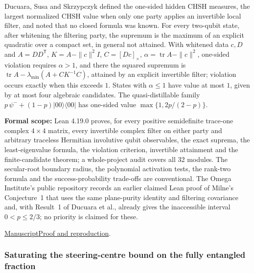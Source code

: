 \documentclass[11pt,a4paper]{article}
\begin{document}
Ducuara, Susa and Skrzypczyk defined the one-sided hidden CHSH measures, the largest normalized CHSH value when only one party applies an invertible local filter, and noted that no closed formula was known. For every two-qubit state, after whitening the filtering party, the supremum is the maximum of an explicit quadratic over a compact set, in general not attained. With whitened data $c,D$ and $A=DD^{\mathsf T}$, $K=A-\|c\|^2I$, $C=[Dc]_\times$, $\alpha=\operatorname{tr}A-\|c\|^2$, one-sided violation requires $\alpha>1$, and there the squared supremum is $\operatorname{tr}A-\lambda_{\min}(A+CK^{-1}C)$, attained by an explicit invertible filter; violation occurs exactly when this exceeds $1$. States with $\alpha\le1$ have value at most $1$, given by at most four algebraic candidates. The quasi-distillable family $p\,\psi^-+(1-p)|00\rangle\langle00|$ has one-sided value $\max\{1,2p/(2-p)\}$.

\noindent\textbf{Formal scope:} Lean 4.19.0 proves, for every positive semidefinite trace-one complex $4\times4$ matrix, every invertible complex filter on either party and arbitrary traceless Hermitian involutive qubit observables, the exact suprema, the least-eigenvalue formula, the violation criterion, invertible attainment and the finite-candidate theorem; a whole-project audit covers all 32 modules. The secular-root boundary radius, the polynomial activation tests, the rank-two formula and the success-probability trade-offs are conventional. The Omega Institute's public repository records an earlier claimed Lean proof of Milne's Conjecture~1 that uses the same plane-purity identity and filtering covariance and, with Result~1 of Ducuara et al., already gives the inaccessible interval $0<p\le2/3$; no priority is claimed for these.

\href{https://github.com/dvgyl/math-and-theory/blob/main/papers/physics/unilateral-chsh/manuscript.pdf}{Manuscript}\quad\href{https://github.com/dvgyl/math-and-theory/blob/main/papers/physics/unilateral-chsh/README.md}{Proof and reproduction}.

\subsubsection{Saturating the steering-centre bound on the fully entangled fraction}
\end{document}
